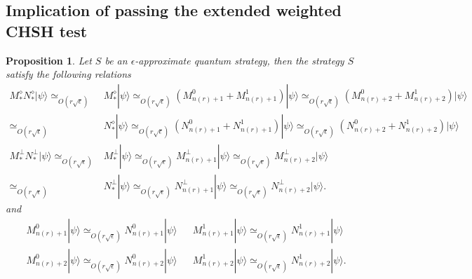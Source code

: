 \documentclass[11pt,letterpaper]{article}
\newcommand{\ket}[1]{|#1\rangle}
\newcommand{\1}{\mathbb{1}}
\newcommand{\nr}{n(r)}
\newcommand{\ep}{\epsilon}
\newcommand{\se}{\sqrt{\epsilon}}
\newcommand{\appd}[1]{\simeq_{#1}}
\newtheorem{proposition}[theorem]{Proposition}
\theoremstyle{definition}
\begin{document}
\subsection{Implication of passing the extended weighted CHSH test}
\label{sec:imp_chsh}
\begin{proposition}
\label{prop:chsh_base}
Let $S$ be an $\ep$-approximate quantum strategy,
then the strategy $S$ satisfy the following relations
\begin{align}
	  M_\ast^\diamond N_\ast^\diamond \ket{\psi}
	  \appd{O( r\se)}&M_\ast^\diamond \ket{\psi} \appd{O( r\se)} (M_{\nr+1}^0+M_{\nr+1}^1)\ket{\psi} \appd{O( r\se)} (M_{\nr+2}^0+M_{\nr+2}^1)\ket{\psi} \\
	  \appd{O( r\se)}&N_\ast^\diamond \ket{\psi} \appd{O( r\se)} (N_{\nr+1}^0+N_{\nr+1}^1)\ket{\psi} \appd{O( r\se)} (N_{\nr+2}^0+N_{\nr+2}^1)\ket{\psi}\\
	M_\ast^\perp N_\ast^\perp\ket{\psi}\appd{O( r\se)} &M_\ast^\perp\ket{\psi} \appd{O( r\se)} M_{\nr+1}^\perp \ket{\psi} \appd{O( r\se)} M_{\nr+2}^\perp \ket{\psi}\\
	\appd{O( r\se)}&N_\ast^\perp\ket{\psi} \appd{O( r\se)} N_{\nr+1}^\perp \ket{\psi} \appd{O( r\se)} N_{\nr+2}^\perp \ket{\psi}.
\end{align}
and
\begin{align}
&M_{\nr+1}^0 \ket{\psi} \appd{O( r\se)} N_{\nr+1}^0 \ket{\psi} && M_{\nr+1}^1\ket{\psi} \appd{O( r\se)} N_{\nr+1}^1 \ket{\psi}\\
&M_{\nr+2}^0 \ket{\psi} \appd{O( r\se)} N_{\nr+2}^0 \ket{\psi} && M_{\nr+2}^1\ket{\psi} \appd{O( r\se)} N_{\nr+2}^1 \ket{\psi}.
\end{align}
\end{proposition}
\end{document}
